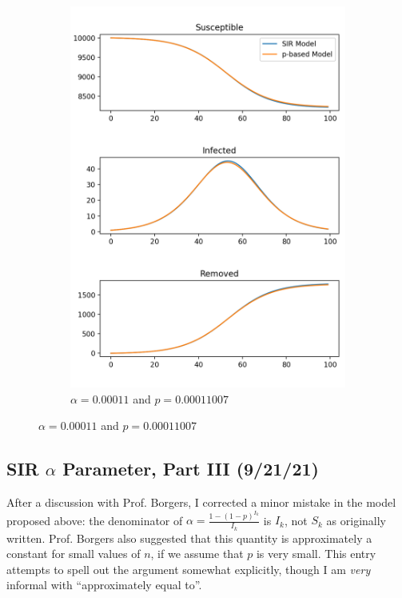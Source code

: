 \documentclass[12pt]{article}
\begin{document}
\begin{figure}[t!]
\begin{subfigure}[t]{0.3\textwidth}
\includegraphics[width=\textwidth]{sir_comparison_11.png}
\caption{$\alpha = 0.00011$ and $p = 0.00011007$}
\end{subfigure}
\end{figure}

\newpage

\subsection{SIR $\alpha$ Parameter, Part III (9/21/21)}
After a discussion with Prof. Borgers, I corrected a minor mistake in the model proposed above: the denominator of $\alpha = \frac{1 - (1-p)^{I_k}}{I_k}$ is $I_k$, not $S_k$ as originally written. Prof. Borgers also suggested that this quantity is approximately a constant for small values of $n$, if we assume that $p$ is very small. This entry attempts to spell out the argument somewhat explicitly, though I am \textit{very} informal with ``approximately equal to''.
\end{document}
